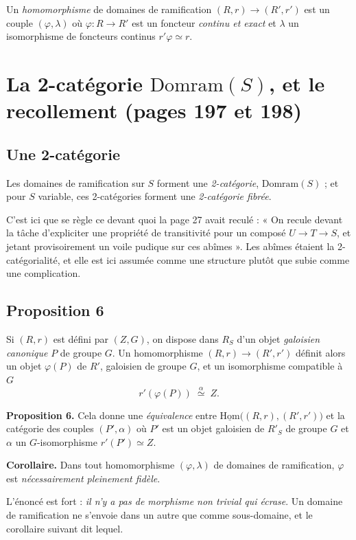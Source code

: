 \documentclass[11pt,a4paper]{article}
\begin{document}
Un \emph{homomorphisme} de domaines de ramification $(R, r) \to (R', r')$ est
un couple $(\varphi, \lambda)$ où $\varphi : R \to R'$ est un foncteur
\emph{continu et exact} et $\lambda$ un isomorphisme de foncteurs continus
$r'\varphi \simeq r$.

\section*{La 2-catégorie $\mathrm{Domram}(S)$, et le recollement (pages 197 et 198)}

\subsection*{Une 2-catégorie}

Les domaines de ramification sur $S$ forment une \emph{2-catégorie},
$\mathrm{Domram}(S)$ ; et pour $S$ variable, ces 2-catégories forment une
\emph{2-catégorie fibrée}.

C'est ici que se règle ce devant quoi la page 27 avait reculé : « On recule
devant la tâche d'expliciter une propriété de transitivité pour un composé
$U \to T \to S$, et jetant provisoirement un voile pudique sur ces abîmes ».
Les abîmes étaient la 2-catégorialité, et elle est ici assumée comme une
structure plutôt que subie comme une complication.

\subsection*{Proposition 6}

Si $(R, r)$ est défini par $(Z, G)$, on dispose dans $R_{S}$ d'un objet
\emph{galoisien canonique} $P$ de groupe $G$. Un homomorphisme
$(R, r) \to (R', r')$ définit alors un objet $\varphi(P)$ de $R'$, galoisien de
groupe $G$, et un isomorphisme compatible à $G$
\[
  r'(\varphi(P)) \;\overset{\alpha}{\simeq}\; Z .
\]

\textbf{Proposition 6.} Cela donne une \emph{équivalence} entre
$\underline{\mathrm{Hom}}\bigl((R,r),(R',r')\bigr)$ et la catégorie des couples
$(P', \alpha)$ où $P'$ est un objet galoisien de $R'_{S}$ de groupe $G$ et
$\alpha$ un $G$-isomorphisme $r'(P') \simeq Z$.

\textbf{Corollaire.} Dans tout homomorphisme $(\varphi, \lambda)$ de domaines
de ramification, $\varphi$ est \emph{nécessairement pleinement fidèle}.

L'énoncé est fort : \emph{il n'y a pas de morphisme
non trivial qui écrase}. Un domaine de ramification ne s'envoie dans un autre
que comme sous-domaine, et le corollaire suivant dit lequel.
\end{document}

